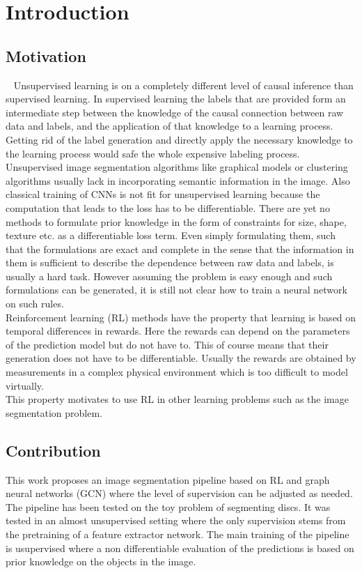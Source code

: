 \chapter{Introduction}
\section{Motivation}~\label{chap:motivation}
Unsupervised learning is on a completely different level of causal inference than supervised learning. In supervised learning the labels that are provided form an intermediate step between the knowledge of the causal connection between raw data and labels, and the application of that knowledge to a learning process. Getting rid of the label generation and directly apply the necessary knowledge to the learning process would safe the whole expensive labeling process.\\
Unsupervised image segmentation algorithms like graphical models or clustering algorithms usually lack in incorporating semantic information in the image. Also classical training of CNNs is not fit for unsupervised learning because the computation that leads to the loss has to be differentiable. There are yet no methods to formulate prior knowledge in the form of constraints for size, shape, texture etc. as a differentiable loss term. Even simply formulating them, such that the formulations are exact and complete in the sense that the information in them is sufficient to describe the dependence between raw data and labels, is usually a hard task. However assuming the problem is easy enough and such formulations can be generated, it is still not clear how to train a neural network on such rules.\\
Reinforcement learning (RL) methods have the property that learning is based on temporal differences in rewards. Here the rewards can depend on the parameters of the prediction model but do not have to. This of course means that their generation does not have to be differentiable. Usually the rewards are obtained by measurements in a complex physical environment which is too difficult to model virtually.\\
This property motivates to use RL in other learning problems such as the image segmentation problem.

\section{Contribution}
This work proposes an image segmentation pipeline based on RL and graph neural networks (GCN) where the level of supervision can be adjusted as needed. The pipeline has been tested on the toy problem of segmenting discs. It was tested in an almost unsupervised setting where the only supervision stems from the pretraining of a feature extractor network. The main training of the pipeline is usupervised where a non differentiable evaluation of the predictions is based on prior knowledge on the objects in the image.